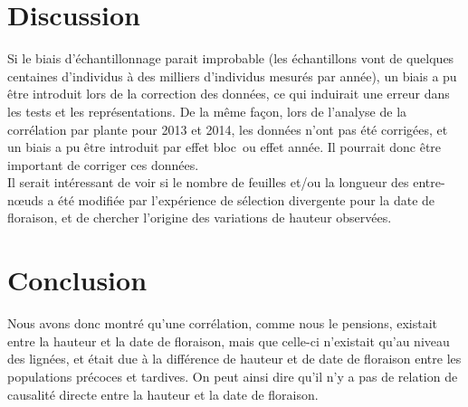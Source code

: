 \documentclass[12pt,a4paper]{article}
\begin{document}
			 	\section{Discussion}
			 		
			 		Si le biais d'échantillonnage parait improbable (les échantillons vont de quelques centaines d'individus à des milliers d'individus mesurés par année), un biais a pu être introduit lors de la correction des données, ce qui induirait une erreur dans les tests et les représentations. De la même façon, lors de l'analyse de la corrélation par plante pour 2013 et 2014,  les données n'ont pas été corrigées, et un biais a pu être introduit par \og effet bloc\fg~ou \og effet année\fg. Il pourrait donc être important de corriger ces données.\\
			 		
			 		Il serait intéressant de voir si le nombre de feuilles et/ou la longueur des entre-n\oe{}uds a été modifiée par l'expérience de sélection divergente pour la date de floraison, et de chercher l'origine des variations de hauteur observées.
			 		
			 	\section{Conclusion}
			 		
			 		Nous avons donc montré qu'une corrélation, comme nous le pensions, existait entre la hauteur et la date de floraison, mais que celle-ci n'existait qu'au niveau des lignées, et était due à la différence de hauteur et de date de floraison entre les populations précoces et tardives. On peut ainsi dire qu'il n'y a pas de relation de causalité directe entre la hauteur et la date de floraison.
	
	\newpage
			
	
	
	
	\newpage
	\appendix
		
\end{document}
